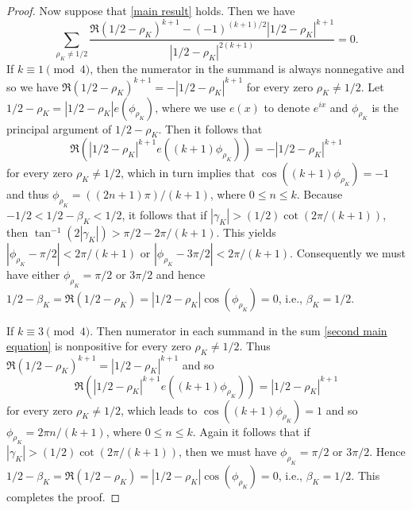 \documentclass[10pt,a4paper]{amsart}
\renewcommand{\leq}{\leqslant}
\begin{document}
\begin{proof}
Now suppose that \eqref{main result} holds. Then we have 
\begin{equation} \label{second main equation}
\sum_{\rho_K \neq 1/2} \frac{\Re(1/2 - \rho_K)^{k + 1} - (-1)^{(k + 1)/2}|1/2 - \rho_K|^{k + 1}}{|1/2 - \rho_K|^{2(k + 1)}} = 0.
\end{equation}
If $k \equiv 1 \pmod{4}$, then the numerator in the summand is always nonnegative and so we have $\Re(1/2 - \rho_K)^{k + 1} = - |1/2 - \rho_K|^{k + 1}$ for every zero $\rho_K \neq 1/2$. Let $1/2 - \rho_K = |1/2 - \rho_K| e({ \phi_{\rho_K}})$, where we use $e(x)$ to denote $e^{ix}$ and $\phi_{\rho_K}$ is the principal argument of $1/2 - \rho_K$. Then it follows that
\[
\Re \left( \left|1/2 - \rho_K \right|^{k + 1} e({(k + 1) \phi_{\rho_K}}) \right)= - \left|1/2 - \rho_K \right|^{k + 1}
\]
for every zero $\rho_K \neq 1/2$, which in turn implies that $\cos((k + 1) \phi_{\rho_K}) = -1$ and thus $\phi_{\rho_K} =((2n + 1) \pi)/(k + 1)$, where $0 \leq n \leq  k$. Because $-1/2 < 1/2 - \beta_K < 1/2$, it follows that if $|\gamma_K|> (1/2) \cot (2 \pi/(k + 1))$, then $\tan^{-1}(2|\gamma_K|) > \pi/2 - 2\pi/(k + 1)$. This yields $|\phi_{\rho_K} - \pi/2| < 2 \pi/(k + 1)$  or $|\phi_{\rho_K} - 3 \pi/2| < 2 \pi/(k + 1)$. Consequently we must have either $\phi_{\rho_K} = \pi/2$ or $3 \pi/2$  and hence $1/2- \beta_K =  \Re(1/2  -\rho_K) = |1/2 - \rho_K|\cos(\phi_{\rho_K}) = 0$, i.e.,  $\beta_K = 1/2$.

If $k \equiv 3 \pmod{4}$. Then numerator in each summand in the sum \eqref{second main equation} is nonpositive for every zero $\rho_K \neq 1/2$. Thus $\Re (1/2 - \rho_K)^{k + 1} = |1/2 - \rho_K|^{k + 1}$ and so
\[
\Re \left(\left| 1/2 - \rho_K \right|^{k + 1} e({(k + 1) \phi_{\rho_K}}) \right)=  \left| 1/2 - \rho_K \right|^{k + 1}
\]
for every zero $\rho_K \neq 1/2$, which leads to $\cos((k + 1) \phi_{\rho_K}) = 1$ and so $\phi_{\rho_K} = 2\pi n/(k + 1)$, where $0 \leq n \leq k$. Again it follows that if $|\gamma_K| > (1/2) \cot (2 \pi/(k + 1))$, then we must have $\phi_{\rho_K} =  \pi/2$ or $3 \pi/2$. Hence $1/2 - \beta_K = \Re(1/2 - \rho_K) = |1/2 - \rho_K| \cos (\phi_{\rho_K}) = 0$, i.e., $\beta_K = 1/2$. This completes the proof.
\end{proof}
\end{document}
